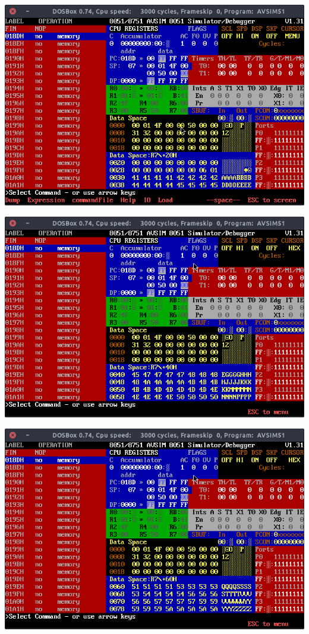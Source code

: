 \documentclass[doc, donotrepeattitle, biblatex, apacite]{apa6}
\begin{document}
\begin{center}
\includegraphics[scale=0.5]{icler3}

\includegraphics[scale=0.5]{icler4}

\includegraphics[scale=0.5]{icler5}
\end{center}
\end{document}
